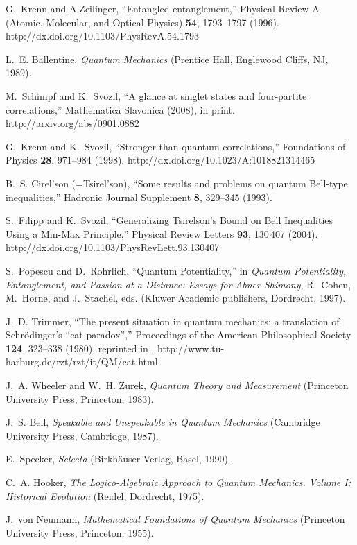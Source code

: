 \documentclass[fleqn,twoside]{article}      %
\begin{document}
\begin{thebibliography}{10}
G.~Krenn and A.Zeilinger, \enquote{Entangled entanglement,} Physical Review A
  (Atomic, Molecular, and Optical Physics) {\bf 54}, 1793--1797 (1996).
\newline http://dx.doi.org/10.1103/PhysRevA.54.1793

L.~E. Ballentine, {\em Quantum Mechanics\/} (Prentice Hall, Englewood Cliffs,
  NJ, 1989).

M.~Schimpf and K.~Svozil, \enquote{A glance at singlet states and four-partite
  correlations,} Mathematica Slavonica  (2008), in print.
\newline http://arxiv.org/abs/0901.0882

G.~Krenn and K.~Svozil, \enquote{Stronger-than-quantum correlations,}
  Foundations of Physics {\bf 28}, 971--984 (1998).
\newline http://dx.doi.org/10.1023/A:1018821314465

B.~S. {Cirel'son (=Tsirel'son)}, \enquote{Some results and problems on quantum
  {B}ell-type inequalities,} Hadronic Journal Supplement {\bf 8}, 329--345
  (1993).

S.~Filipp and K.~Svozil, \enquote{Generalizing {T}sirelson's Bound on Bell
  Inequalities Using a Min-Max Principle,} Physical Review Letters {\bf 93},
  130\,407 (2004).
\newline http://dx.doi.org/10.1103/PhysRevLett.93.130407

S.~Popescu and D.~Rohrlich, \enquote{Quantum Potentiality,} in {\em Quantum
  Potentiality, Entanglement, and Passion-at-a-Distance: Essays for Abner
  Shimony\/}, R.~Cohen, M.~Horne, and J.~Stachel, eds.  (Kluwer Academic
  publishers, Dordrecht, 1997).

J.~D. Trimmer, \enquote{The present situation in quantum mechanics: a
  translation of {S}chr{\"{o}}dinger's ``cat paradox'',} Proceedings of the
  American Philosophical Society {\bf 124}, 323--338 (1980), reprinted in
  \cite[pp. 152-167]{wheeler-Zurek:83}.
\newline http://www.tu-harburg.de/rzt/rzt/it/QM/cat.html

J.~A. Wheeler and W.~H. Zurek, {\em Quantum Theory and Measurement\/}
  (Princeton University Press, Princeton, 1983).

J.~S. Bell, {\em Speakable and Unspeakable in Quantum Mechanics\/} (Cambridge
  University Press, Cambridge, 1987).

E.~Specker, {\em Selecta\/} (Birkh{\"{a}}user Verlag, Basel, 1990).

C.~A. Hooker, {\em The Logico-Algebraic Approach to Quantum Mechanics. {V}olume
  {I}: Historical Evolution\/} (Reidel, Dordrecht, 1975).

J.~von Neumann, {\em Mathematical Foundations of Quantum Mechanics\/}
  (Princeton University Press, Princeton, 1955).

\end{thebibliography}
\end{document}
